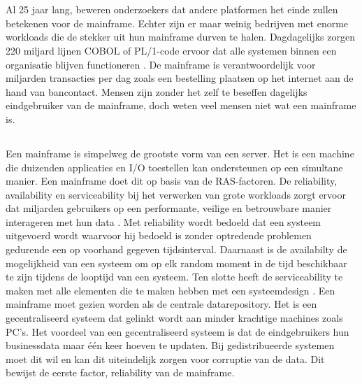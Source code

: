 
\chapter{}
\label{ch:inleiding}
Al 25 jaar lang, beweren onderzoekers dat andere platformen het einde zullen betekenen voor de mainframe. Echter zijn er maar weinig bedrijven met enorme workloads die de stekker uit hun mainframe durven te halen. Dagdagelijks zorgen 220 miljard lijnen COBOL of PL/1-code ervoor dat alle systemen binnen een organisatie blijven functioneren \autocite{Scannell2017}. De mainframe is verantwoordelijk voor miljarden transacties per dag zoals een bestelling plaatsen op het internet aan de hand van bancontact. Mensen zijn zonder het zelf te beseffen dagelijks eindgebruiker van de mainframe, doch weten veel mensen niet wat een mainframe is. 

\section{}

Een mainframe is simpelweg de grootste vorm van een server. Het is een machine die duizenden applicaties en I/O toestellen kan ondersteunen op een simultane manier.  Een mainframe doet dit op basis van de RAS-factoren. De reliability, availability en serviceability bij het verwerken van grote workloads zorgt ervoor dat miljarden gebruikers op een performante, veilige en betrouwbare manier interageren met hun data \autocite{Ebbers2022}. Met reliability wordt bedoeld dat een systeem uitgevoerd wordt waarvoor hij bedoeld is zonder optredende problemen gedurende een op voorhand gegeven tijdsinterval. Daarnaast is de availabilty de mogelijkheid van een systeem om op elk random moment in de tijd beschikbaar te zijn tijdens de looptijd van een systeem. Ten slotte heeft de serviceability te maken met alle elementen die te maken hebben met een systeemdesign \autocite{Johnson1988}.  Een mainframe moet gezien worden als de centrale datarepository. Het is een gecentraliseerd systeem dat gelinkt wordt aan minder krachtige machines zoals PC's.  Het voordeel van een gecentraliseerd systeem is dat de eindgebruikers hun businessdata maar één keer hoeven te updaten. Bij gedistribueerde systemen moet dit wil en kan dit uiteindelijk zorgen voor corruptie van de data. Dit bewijst de eerste factor, reliability van de mainframe. 

